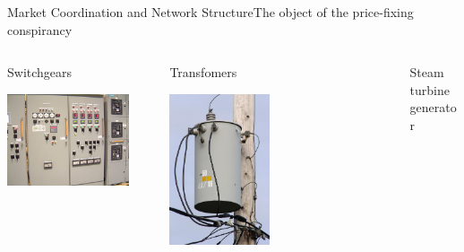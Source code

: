 \documentclass[aspectratio=1610]{beamer}
\begin{document}
\begin{frame}{Market Coordination and Network Structure}{The object of the price-fixing conspirancy}
	\begin{columns}
		\begin{column}{0.33\textwidth}
			\centering 
			Switchgears

			\includegraphics[width=0.85\textwidth]{images/switchgear}
		\end{column}
		\begin{column}{0.33\textwidth}
			\centering 
			Transfomers

			\includegraphics[width=0.45\textwidth]{images/transformer.jpeg}
		\end{column}
		\begin{column}{0.33\textwidth}
			\centering 
			Steam turbine generator


\end{column}
\end{columns}
\end{frame}
\end{document}

